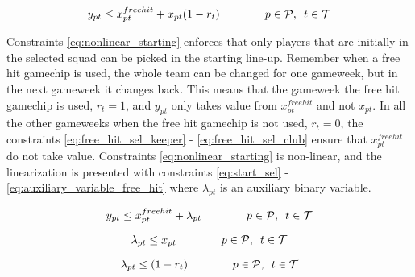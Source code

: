 \begin{equation} \label{eq:nonlinear_starting}
    y_{pt} \leq x_{pt}^{free hit} + x_{pt}(1-r_{t}) \qquad\qquad  p \in \mathcal{P}, \enskip t \in \mathcal{T}
\end{equation}

Constraints \eqref{eq:nonlinear_starting} enforces that only players that are initially in the selected squad can be picked in the starting line-up. Remember when a free hit gamechip is used, the whole team can be changed for one gameweek, but in the next gameweek it changes back. This means that the gameweek the free hit gamechip is used, $r_{t} = 1$, and $y_{pt}$ only takes value from $x_{pt}^{free hit}$ and not $x_{pt}$. In all the other gameweeks when the free hit gamechip is not used, $r_{t} = 0$, the constraints \eqref{eq:free_hit_sel_keeper} - \eqref{eq:free_hit_sel_club} ensure that $x_{pt}^{free hit}$ do not take value. Constraints \eqref{eq:nonlinear_starting} is non-linear, and the linearization is presented with constraints \eqref{eq:start_sel} - \eqref{eq:auxiliary_variable_free_hit} where $\lambda_{pt}$ is an auxiliary binary variable.


\begin{equation}\label{eq:start_sel}
    y_{pt} \leq x_{pt}^{free hit} + \lambda_{pt} \qquad\qquad  p \in \mathcal{P}, \enskip t \in \mathcal{T}
\end{equation}

\begin{equation} \label{eq:auxiliary_variable_x}
    \lambda_{pt} \leq {x}_{pt}  \qquad\qquad  p \in \mathcal{P}, \enskip t \in \mathcal{T}
\end{equation}

\begin{equation} \label{eq:auxiliary_variable_free_hit}
    \lambda_{pt} \leq (1-r_{t}) \qquad\qquad  p \in \mathcal{P}, \enskip t \in \mathcal{T}
\end{equation}

